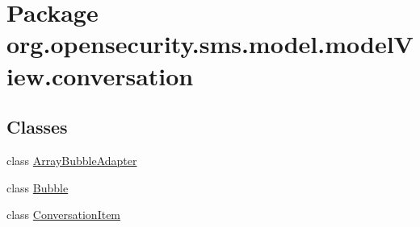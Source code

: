 \hypertarget{a00038}{\section{Package org.\+opensecurity.\+sms.\+model.\+model\+View.\+conversation}
\label{a00038}
}
\subsection*{Classes}
\begin{DoxyCompactItemize}
\item 
class \hyperlink{a00002}{Array\+Bubble\+Adapter}
\item 
class \hyperlink{a00004}{Bubble}
\item 
class \hyperlink{a00007}{Conversation\+Item}
\end{DoxyCompactItemize}
